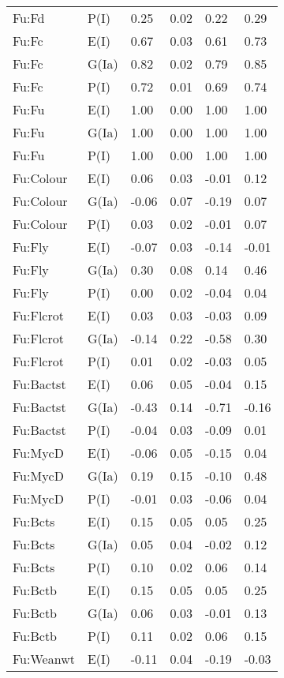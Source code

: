 \begin{center}
\begin{longtable}{|p{1.1in}|p{0.7in}|p{0.7in}|p{0.6in}|p{0.6in}|p{0.6in}|}
  Fu:Fd & P(I) & 0.25 & 0.02 & 0.22 & 0.29 \\ 
  Fu:Fc & E(I) & 0.67 & 0.03 & 0.61 & 0.73 \\ 
  Fu:Fc & G(Ia) & 0.82 & 0.02 & 0.79 & 0.85 \\ 
  Fu:Fc & P(I) & 0.72 & 0.01 & 0.69 & 0.74 \\ 
  Fu:Fu & E(I) & 1.00 & 0.00 & 1.00 & 1.00 \\ 
  Fu:Fu & G(Ia) & 1.00 & 0.00 & 1.00 & 1.00 \\ 
  Fu:Fu & P(I) & 1.00 & 0.00 & 1.00 & 1.00 \\ 
  Fu:Colour & E(I) & 0.06 & 0.03 & -0.01 & 0.12 \\ 
  Fu:Colour & G(Ia) & -0.06 & 0.07 & -0.19 & 0.07 \\ 
  Fu:Colour & P(I) & 0.03 & 0.02 & -0.01 & 0.07 \\ 
  Fu:Fly & E(I) & -0.07 & 0.03 & -0.14 & -0.01 \\ 
  Fu:Fly & G(Ia) & 0.30 & 0.08 & 0.14 & 0.46 \\ 
  Fu:Fly & P(I) & 0.00 & 0.02 & -0.04 & 0.04 \\ 
  Fu:Flcrot & E(I) & 0.03 & 0.03 & -0.03 & 0.09 \\ 
  Fu:Flcrot & G(Ia) & -0.14 & 0.22 & -0.58 & 0.30 \\ 
  Fu:Flcrot & P(I) & 0.01 & 0.02 & -0.03 & 0.05 \\ 
  Fu:Bactst & E(I) & 0.06 & 0.05 & -0.04 & 0.15 \\ 
  Fu:Bactst & G(Ia) & -0.43 & 0.14 & -0.71 & -0.16 \\ 
  Fu:Bactst & P(I) & -0.04 & 0.03 & -0.09 & 0.01 \\ 
  Fu:MycD & E(I) & -0.06 & 0.05 & -0.15 & 0.04 \\ 
  Fu:MycD & G(Ia) & 0.19 & 0.15 & -0.10 & 0.48 \\ 
  Fu:MycD & P(I) & -0.01 & 0.03 & -0.06 & 0.04 \\ 
  Fu:Bcts & E(I) & 0.15 & 0.05 & 0.05 & 0.25 \\ 
  Fu:Bcts & G(Ia) & 0.05 & 0.04 & -0.02 & 0.12 \\ 
  Fu:Bcts & P(I) & 0.10 & 0.02 & 0.06 & 0.14 \\ 
  Fu:Bctb & E(I) & 0.15 & 0.05 & 0.05 & 0.25 \\ 
  Fu:Bctb & G(Ia) & 0.06 & 0.03 & -0.01 & 0.13 \\ 
  Fu:Bctb & P(I) & 0.11 & 0.02 & 0.06 & 0.15 \\ 
  Fu:Weanwt & E(I) & -0.11 & 0.04 & -0.19 & -0.03 \\ 

\end{longtable}
\end{center}
